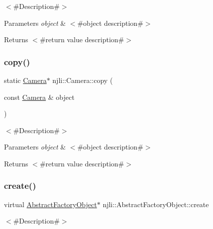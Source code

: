 $<$\#\+Description\#$>$


\begin{DoxyParams}{Parameters}
{\em object} & $<$\#object description\#$>$\\
\hline
\end{DoxyParams}
\begin{DoxyReturn}{Returns}
$<$\#return value description\#$>$ 
\end{DoxyReturn}
\mbox{\label{classnjli_1_1_camera_a7877ec046260132d8c3869adb77d8c14}} 
\subsubsection{\texorpdfstring{copy()}{copy()}}
{\footnotesize\ttfamily static \mbox{\hyperlink{classnjli_1_1_camera}{Camera}}$\ast$ njli\+::\+Camera\+::copy (\begin{DoxyParamCaption}\item[{const \mbox{\hyperlink{classnjli_1_1_camera}{Camera}} \&}]{object }\end{DoxyParamCaption})\hspace{0.3cm}{\ttfamily [static]}}

$<$\#\+Description\#$>$


\begin{DoxyParams}{Parameters}
{\em object} & $<$\#object description\#$>$\\
\hline
\end{DoxyParams}
\begin{DoxyReturn}{Returns}
$<$\#return value description\#$>$ 
\end{DoxyReturn}
\mbox{\label{classnjli_1_1_camera_a83a8876ae63b92804004cf3febe76573}} 
\subsubsection{\texorpdfstring{create()}{create()}\hspace{0.1cm}{\footnotesize\ttfamily [1/3]}}
{\footnotesize\ttfamily virtual \mbox{\hyperlink{classnjli_1_1_abstract_factory_object}{Abstract\+Factory\+Object}}$\ast$ njli\+::\+Abstract\+Factory\+Object\+::create}

$<$\#\+Description\#$>$


